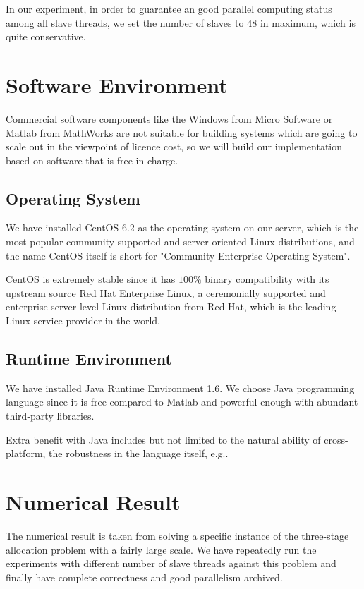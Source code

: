 \documentclass[12pt,a4paper]{report}
\begin{document}
In our experiment, in order to guarantee an good parallel computing status among all slave threads, we set the number of slaves to 48 in maximum, which is quite conservative.

\section{Software Environment}

Commercial software components like the Windows from Micro Software or Matlab from MathWorks are not suitable for building systems which are going to scale out in the viewpoint of licence cost, so we will build our implementation based on software that is free in charge.

\subsection{Operating System}

We have installed CentOS 6.2 as the operating system on our server, which is the most popular community supported and server oriented Linux distributions, and the name CentOS itself is short for "Community Enterprise Operating System".

CentOS is extremely stable since it has $100\%$ binary compatibility with its upstream source Red Hat Enterprise Linux, a ceremonially supported and enterprise server level Linux distribution from Red Hat, which is the leading Linux service provider in the world. 

\subsection{Runtime Environment}

We have installed Java Runtime Environment 1.6. We choose Java programming language since it is free compared to Matlab and powerful enough with abundant third-party libraries.

Extra benefit with Java includes but not limited to the natural ability of cross-platform, the robustness in the language itself, e.g..

\section{Numerical Result}

The numerical result is taken from solving a specific instance of the three-stage allocation problem with a fairly large scale. We have repeatedly run the experiments with different number of slave threads against this problem and finally have complete correctness and good parallelism archived.
\end{document}
